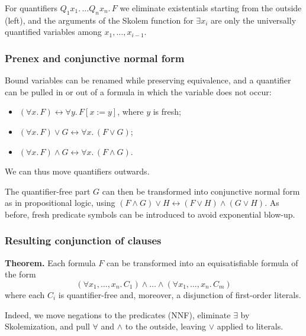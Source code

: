For quantifiers $Q_1 x_1.\, \ldots Q_n x_n.\, F$ we eliminate existentials starting from the outside (left), and the arguments of the Skolem function for $\exists x_i$ are only the universally quantified variables among $x_1, \ldots, x_{i-1}$.
 
\subsubsection*{Prenex and conjunctive normal form}
 
Bound variables can be renamed while preserving equivalence, and a quantifier can be pulled in or out of a formula in which the variable does not occur:
\begin{itemize}
  \item $(\forall x.\, F) \leftrightarrow \forall y.\, F[x := y]$, where $y$ is fresh;
  \item $(\forall x.\, F) \vee G \leftrightarrow \forall x.\, (F \vee G)$;
  \item $(\forall x.\, F) \wedge G \leftrightarrow \forall x.\, (F \wedge G)$.
\end{itemize}
We can thus move quantifiers outwards.
 
 
The quantifier-free part $G$ can then be transformed into conjunctive normal form as in propositional logic, using $(F \wedge G) \vee H \leftrightarrow (F \vee H) \wedge (G \vee H)$. As before, fresh predicate symbols can be introduced to avoid exponential blow-up.
 
\subsubsection*{Resulting conjunction of clauses}
 
\noindent\textbf{Theorem.} Each formula $F$ can be transformed into an equisatisfiable formula of the form
\[
(\forall x_1, \ldots, x_n.\, C_1) \wedge \ldots \wedge (\forall x_1, \ldots, x_n.\, C_m)
\]
where each $C_i$ is quantifier-free and, moreover, a disjunction of first-order literals.
 
Indeed, we move negations to the predicates (NNF), eliminate $\exists$ by Skolemization, and pull $\forall$ and $\wedge$ to the outside, leaving $\vee$ applied to literals.
 
 
